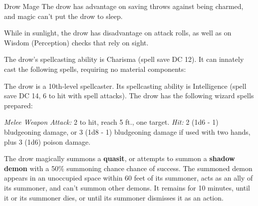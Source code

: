 \documentclass[10pt,a4paper,twoside,bg=print,twocolumn,openany,nodeprecatedcode]{dndbook}
\begin{document}
\begin{DndMonster}[float=t]{Drow Mage}
\DndMonsterBasics[
armor-class = {12 (15 with \textit{mage armor})},
hit-points = {\DndDice{10d8}},
speed = {30 ft.}
]
\DndMonsterAbilityScores[
 str = 9,
 dex = 14,
 con = 10,
 int = 17,
 wis = 13,
 cha = 12
]
\DndMonsterDetails[
skills = {Arcana +6, Deception +4, Perception +4, Stealth +5},
senses = {darkvision 120 ft., passive perception 14},
languages = {Elvish, Undercommon},
challenge = 7,
]
The drow has advantage on saving throws against being charmed, and magic can't put the drow to sleep.

While in sunlight, the drow has disadvantage on attack rolls, as well as on Wisdom (Perception) checks that rely on sight.

The drow's spellcasting ability is Charisma (spell save DC 12). It can innately cast the following spells, requiring no material components:
\begin{DndMonsterSpells}
\end{DndMonsterSpells}
The drow is a 10th-level spellcaster. Its spellcasting ability is Intelligence (spell save DC 14, 6 to hit with spell attacks). The drow has the following wizard spells prepared:
\begin{DndMonsterSpells}
\end{DndMonsterSpells}
\textsl{Melee Weapon Attack:} 2 to hit, reach 5 ft., one target. \textsl{Hit:} 2 (1d6 - 1) bludgeoning damage, or 3 (1d8 - 1) bludgeoning damage if used with two hands, plus 3 (1d6) poison damage.

The drow magically summons a \textbf{quasit}, or attempts to summon a \textbf{shadow demon} with a 50\% summoning chance chance of success. The summoned demon appears in an unoccupied space within 60 feet of its summoner, acts as an ally of its summoner, and can't summon other demons. It remains for 10 minutes, until it or its summoner dies, or until its summoner dismisses it as an action.

\end{DndMonster}
\end{document}
